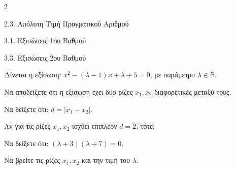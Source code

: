 \begin{ylh}{2}
    \item 2.3. Απόλυτη Τιμή Πραγματικού Αριθμού
    \item 3.1. Εξισώσεις 1ου Βαθμού
    \item 3.3. Εξισώσεις 2ου Βαθμού
\end{ylh}
Δίνεται η εξίσωση: $x^2 - (\lambda-1)x + \lambda + 5 = 0$, με παράμετρο $\lambda \in \mathbb{R}$.

\begin{alist}
\item Να αποδείξετε ότι η εξίσωση έχει δύο ρίζες $x_1, x_2$ διαφορετικές μεταξύ τους.
\item Να δείξετε ότι: $d = |x_1-x_2|$. 
\item Αν για τις ρίζες $x_1, x_2$ ισχύει επιπλέον $d = 2$, τότε:
\begin{rlist}
\item
  Να δείξετε ότι: $(\lambda+3)(\lambda+7) = 0$. 
\item
  Να βρείτε τις ρίζες $x_1, x_2$ και την τιμή του $\lambda$. 
\end{rlist}
\end{alist}

